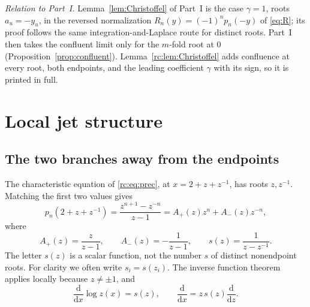 \documentclass[11pt,a4paper]{article}
\numberwithin{equation}{section}
\theoremstyle{definition}
\theoremstyle{remark}
\newcommand{\dd}{\mathrm d}
\begin{document}
\noindent\emph{Relation to Part~I.}  Lemma~\ref{lem:Christoffel} of
Part~I is the case $\gamma=1$, roots $a_u=-y_u$, in the reversed
normalization $R_n(y)=(-1)^np_n(-y)$ of \eqref{eq:R}; its proof follows
the same integration-and-Laplace route for distinct roots.  Part~I then takes the
confluent limit only for the $m$-fold root at $0$
(Proposition~\ref{prop:confluent}).  Lemma~\ref{rc:lem:Christoffel} adds
confluence at every root, both endpoints, and the leading coefficient
$\gamma$ with its sign, so it is printed in full.

\section{Local jet structure}\label{rc:sec:jets}

\subsection{The two branches away from the endpoints}
The characteristic equation of \eqref{rc:eq:prec}, at $x=2+z+z^{-1}$, has
roots $z,z^{-1}$.  Matching the first two values gives
\begin{equation}\label{rc:eq:branch}
 p_n(2+z+z^{-1})=\frac{z^{n+1}-z^{-n}}{z-1}
       =A_+(z)z^n+A_-(z)z^{-n},
\end{equation}
where
\begin{equation}\label{rc:eq:AandS}
 A_+(z)=\frac{z}{z-1},\qquad A_-(z)=-\frac1{z-1},\qquad
 s(z)=\frac1{z-z^{-1}}.
\end{equation}
The letter $s(z)$ is a scalar function, not the number $s$ of distinct
nonendpoint roots.  For clarity we often write $s_i=s(z_i)$.
The inverse function theorem applies locally because $z\ne\pm1$, and
\begin{equation}\label{rc:eq:logderivative}
 \frac{\dd}{\dd x}\log z(x)=s(z),\qquad
 \frac{\dd}{\dd x}=z\,s(z)\frac{\dd}{\dd z}.
\end{equation}
\end{document}

